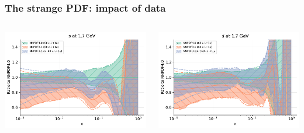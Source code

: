 \documentclass{beamer}
\begin{document}
\begin{frame}
 \frametitle{The strange PDF: impact of data}
 \footnotesize
 \centering
 \begin{columns}[c]
  \begin{column}{0.5\textwidth}
   \centering
   \includegraphics[width=\columnwidth]{plots/strange_1}\\
  \end{column}
  \begin{column}{0.5\textwidth}
   \centering
   \includegraphics[width=\columnwidth]{plots/strange_2}\\
  \end{column}
 \end{columns}
 \begin{columns}[c]

\end{columns}
\end{frame}
\end{document}
